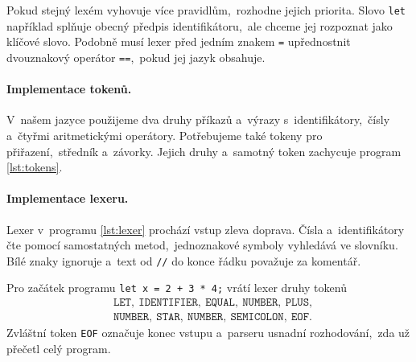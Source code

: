 Pokud stejný lexém vyhovuje více pravidlům,~rozhodne jejich priorita. Slovo \texttt{let} například splňuje obecný předpis identifikátoru,~ale chceme jej rozpoznat jako klíčové slovo. Podobně musí lexer před jedním znakem \texttt{=} upřednostnit dvouznakový operátor \texttt{==},~pokud jej jazyk obsahuje.


\paragraph{Implementace tokenů.}

V~našem jazyce použijeme dva druhy příkazů a~výrazy s~identifikátory,~čísly a~čtyřmi aritmetickými operátory. Potřebujeme také tokeny pro přiřazení,~středník a~závorky. Jejich druhy a~samotný token zachycuje program \ref{lst:tokens}.



\paragraph{Implementace lexeru.}

Lexer v~programu \ref{lst:lexer} prochází vstup zleva doprava. Čísla a~identifikátory čte pomocí samostatných metod,~jednoznakové symboly vyhledává ve slovníku. Bílé znaky ignoruje a~text od \texttt{//} do konce řádku považuje za komentář.



Pro začátek programu \texttt{let x = 2 + 3 * 4;} vrátí lexer druhy tokenů
\[
\begin{aligned}
    &\texttt{LET},\ \texttt{IDENTIFIER},\ \texttt{EQUAL},\
      \texttt{NUMBER},\ \texttt{PLUS},\\
    &\texttt{NUMBER},\ \texttt{STAR},\ \texttt{NUMBER},\
      \texttt{SEMICOLON},\ \texttt{EOF}.
\end{aligned}
\]
Zvláštní token \texttt{EOF} označuje konec vstupu a~parseru usnadní rozhodování,~zda už přečetl celý program.
